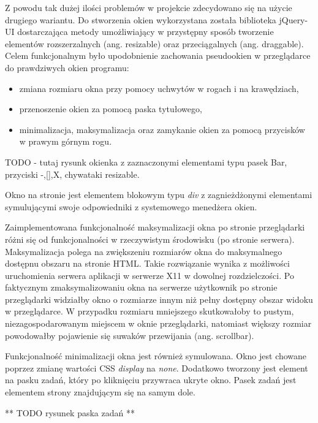 Z powodu tak dużej ilości problemów w projekcie zdecydowano się na użycie drugiego wariantu. Do stworzenia okien wykorzystana została biblioteka jQuery-UI dostarczająca metody umożliwiający w przystępny sposób tworzenie elementów rozszerzalnych (ang. resizable) oraz przeciągalnych (ang. draggable). Celem funkcjonalnym było upodobnienie zachowania pseudookien w przeglądarce do prawdziwych okien programu:
\begin{itemize}
  \item zmiana rozmiaru okna przy pomocy uchwytów w rogach i na krawędziach,
  \item przenoszenie okien za pomocą paska tytułowego,
  \item minimalizacja, maksymalizacja oraz zamykanie okien za pomocą przycisków w prawym górnym rogu.
\end{itemize}

TODO - tutaj rysunk okienka z zaznaczonymi elementami typu pasek Bar, przyciski -,[],X, chywataki resizable.

Okno na stronie jest elementem blokowym typu \emph{div} z zagnieżdżonymi elementami symulującymi swoje odpowiedniki z systemowego menedżera okien.

Zaimplementowana funkcjonalność maksymalizacji okna po stronie przeglądarki różni się od funkcjonalności w rzeczywistym środowisku (po stronie serwera). Maksymalizacja polega na zwiększeniu rozmiarów okna do maksymalnego dostępnu obszaru na stronie HTML.
Takie rozwiązanie wynika z możliwości uruchomienia serwera aplikacji w serwerze X11 w dowolnej rozdzielczości. Po faktycznym zmaksymalizowaniu okna na serwerze użytkownik po stronie przeglądarki widziałby okno o rozmiarze innym niż pełny dostępny obszar widoku w przeglądarce. W przypadku rozmiaru mniejszego skutkowałoby to pustym, niezagospodarowanym miejscem w oknie przeglądarki, natomiast większy rozmiar powodowałby pojawienie się suwaków przewijania (ang. scrollbar).

Funkcjonalność minimalizacji okna jest również symulowana. Okno jest chowane poprzez zmianę wartości CSS \emph{display} na \emph{none}. Dodatkowo tworzony jest element na pasku zadań, który po kliknięciu przywraca ukryte okno. Pasek zadań jest elementem strony znajdującym się na samym dole.

** TODO rysunek paska zadań **

